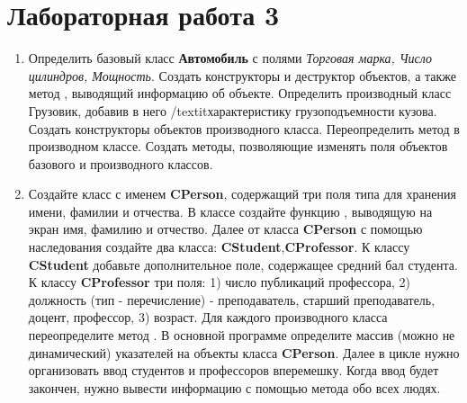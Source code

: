 \section{Лабораторная работа 3}
\begin{enumerate}[leftmargin=*]
    \item Определить базовый класс \textbf{Автомобиль} с полями \textit{Торговая марка, Число цилиндров, Мощность}. Создать конструкторы и деструктор объектов, а также метод , выводящий информацию об объекте. Определить производный класс Грузовик, добавив в него /textit{характеристику грузоподъемности кузова}. Создать конструкторы объектов производного класса. Переопределить метод  в производном классе. Создать методы, позволяющие изменять поля объектов базового и производного классов.
    \item Создайте класс с именем \textbf{CPerson}, содержащий три поля типа  для хранения имени, фамилии и отчества. В классе создайте функцию , выводящую на экран имя, фамилию и отчество. Далее от класса \textbf{CPerson} с помощью наследования создайте два класса: \textbf{CStudent},\textbf{CProfessor}. К классу \textbf{CStudent} добавьте дополнительное поле, содержащее средний бал студента. К классу \textbf{CProfessor} три поля: 1) число публикаций профессора, 2) должность (тип - перечисление) - преподаватель, старший преподаватель, доцент, профессор, 3) возраст. Для каждого производного класса переопределите метод . В основной программе определите массив (можно не динамический) указателей на объекты класса \textbf{CPerson}. Далее в цикле нужно организовать ввод студентов и профессоров вперемешку. Когда ввод будет закончен, нужно вывести информацию с помощью метода  обо всех людях.
\end{enumerate}

